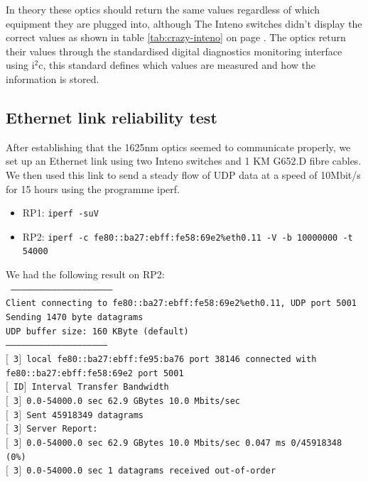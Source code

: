 \documentclass{article}
\begin{document}
In theory these optics should return the same values regardless of which equipment they are plugged into, although The Inteno switches didn't display the correct values as shown in table \ref{tab:crazy-inteno} on page \pageref{tab:crazy-inteno}.
The optics return their values through the standardised digital diagnostics monitoring interface using i$^2$c, this standard defines which values are measured and how the information is stored.\cite{SFF:DDM}

\newpage
\subsection{Ethernet link reliability test}
After establishing that the 1625nm optics seemed to communicate properly, we set up an Ethernet link using two Inteno switches and 1 KM G652.D fibre cables.
We then used this link to send a steady flow of UDP data at a speed of 10Mbit/s for 15 hours using the programme iperf. 
\begin{itemize} 
\item RP1: \texttt{iperf -suV}
\item RP2: \texttt{iperf -c fe80::ba27:ebff:fe58:69e2\%eth0.11 -V -b 10000000 -t 54000}
\end{itemize}
We had the following result on RP2:\\
\texttt{
------------------------------------------------------------\\
Client connecting to fe80::ba27:ebff:fe58:69e2\%eth0.11, UDP port 5001\\
Sending 1470 byte datagrams\\
UDP buffer size:  160 KByte (default)\\
------------------------------------------------------------\\
$[$  3$]$ local fe80::ba27:ebff:fe95:ba76 port 38146 connected with\\ fe80::ba27:ebff:fe58:69e2 port 5001\\
$[$ ID$]$ Interval       Transfer     Bandwidth\\
$[$  3$]$  0.0-54000.0 sec  62.9 GBytes  10.0 Mbits/sec\\
$[$  3$]$ Sent 45918349 datagrams\\
$[$  3$]$ Server Report:\\
$[$  3$]$  0.0-54000.0 sec  62.9 GBytes  10.0 Mbits/sec   0.047 ms    0/45918348 (0\%)\\
$[$  3$]$  0.0-54000.0 sec  1 datagrams received out-of-order\\
}
\end{document}

